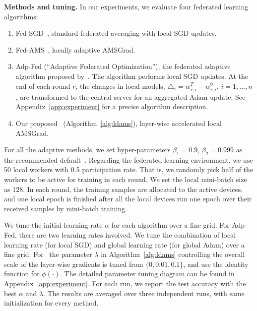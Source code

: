 \documentclass[nohyperref]{article}
\begin{document}
\vspace{0.1in}
\noindent\textbf{Methods and tuning.} In our experiments, we evaluate four federated learning algorithms: 
\begin{enumerate}
    \item Fed-SGD~\citep{mcmahan2017communication}, standard federated averaging with local SGD updates.
    
    \item Fed-AMS~\citep{chen2020toward}, locally adaptive AMSGrad.
    
    \item Adp-Fed (``Adaptive Federated Optimization''), the federated adaptive algorithm proposed by~\cite{reddi2020adaptive}. The algorithm performs local SGD updates. At the end of each round $r$, the changes in local models, $\triangle_i=w_{r,i}^T-w_{r,i}^0$, $i=1,...,n$, are transformed to the central server for an aggregated Adam update. See Appendix~\ref{app:experiment} for a precise algorithm description.
    
    \item Our proposed \algo\ (Algorithm~\ref{alg:ldams}), layer-wise accelerated local AMSGrad.
\end{enumerate}
For all the adaptive methods, we set hyper-parameters $\beta_1=0.9$, $\beta_2=0.999$ as the recommended default~\citep{reddi2019convergence}. Regarding the federated learning environment, we use 50 local workers with 0.5 participation rate. That is, we randomly pick half of the workers to be active for training in each round. We set the local mini-batch size as 128. In each round, the training samples are allocated to the active devices, and one local epoch is finished after all the local devices run one epoch over their received samples by mini-batch training. 

We tune the initial learning rate $\alpha$ for each algorithm over a fine grid. For Adp-Fed, there are two learning rates involved. We tune the combination of local learning rate (for local SGD) and global learning rate (for global Adam) over a fine grid. For \algo\, the parameter $\lambda$ in Algorithm~\ref{alg:ldams} controlling the overall scale of the layer-wise gradients is tuned from $\{0,0.01,0.1\}$, and use the identity function for $\phi(\cdot)$. The detailed parameter tuning diagram can be found in Appendix~\ref{app:experiment}.
For each run, we report the test accuracy with the best $\alpha$ and $\lambda$. 
The results are averaged over three independent runs, with same initialization for every method.
\end{document}
